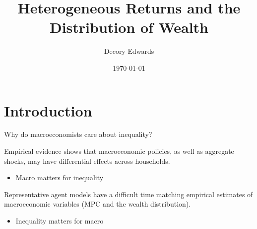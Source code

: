 \documentclass{beamer}
\title[]{Heterogeneous Returns and the Distribution of Wealth}
\author[Edwards]{Decory Edwards}
\institute[JHU]{Johns Hopkins University}
\date{\today}
\begin{document}
\begin{frame}
  \titlepage
\end{frame}

\section{Introduction}

\begin{frame}{Why do macroeconomists care about inequality?}

Empirical evidence shows that macroeconomic policies, as well as aggregate shocks, may have differential effects across households.

\begin{itemize}
\item Macro matters for inequality
\end{itemize}
\vspace{2.5mm}

Representative agent models have a difficult time matching empirical estimates of macroeconomic variables (MPC and the wealth distribution).

\begin{itemize}
\item Inequality matters for macro
\end{itemize}



\end{frame}

    
    
    
    
\end{document}
